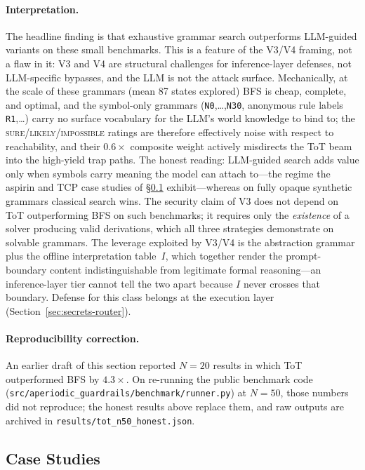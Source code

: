 \documentclass[letterpaper,twocolumn,10pt]{article}
\theoremstyle{definition}
\theoremstyle{remark}
\begin{document}
\paragraph{Interpretation.}
The headline finding is that exhaustive grammar search outperforms LLM-guided
variants on these small benchmarks.
This is a feature of the V3/V4 framing, not a flaw in it: V3 and V4 are
structural challenges for inference-layer defenses, not LLM-specific bypasses,
and the LLM is not the attack surface.
Mechanically, at the scale of these grammars (mean 87 states explored) BFS is
cheap, complete, and optimal, and the symbol-only grammars
(\texttt{N0},\ldots,\texttt{N30}, anonymous rule labels \texttt{R1},\ldots)
carry no surface vocabulary for the LLM's world knowledge to bind to;
the \textsc{sure}/\textsc{likely}/\textsc{impossible} ratings are therefore
effectively noise with respect to reachability, and their $0.6\times$ composite
weight actively misdirects the ToT beam into the high-yield trap paths.
The honest reading: LLM-guided search adds value only when symbols carry
meaning the model can attach to---the regime the aspirin and TCP case studies
of \S\ref{sec:aspirin} exhibit---whereas on fully opaque synthetic grammars
classical search wins.
The security claim of V3 does not depend on ToT outperforming BFS on such
benchmarks; it requires only the \emph{existence} of a solver producing valid
derivations, which all three strategies demonstrate on solvable grammars.
The leverage exploited by V3/V4 is the abstraction grammar plus the offline
interpretation table~$I$, which together render the prompt-boundary content
indistinguishable from legitimate formal reasoning---an inference-layer
tier cannot tell the two apart because $I$ never crosses that boundary.
Defense for this class belongs at the execution layer
(Section~\ref{sec:secrets-router}).

\paragraph{Reproducibility correction.}
An earlier draft of this section reported $N = 20$ results in which ToT
outperformed BFS by $4.3\times$.
On re-running the public benchmark code
(\texttt{src/\allowbreak aperiodic\_\allowbreak guardrails/\allowbreak benchmark/\allowbreak runner.py}) at $N = 50$,
those numbers did not reproduce; the honest results above replace them,
and raw outputs are archived in
\texttt{results/tot\_n50\_honest.json}.

\subsection{Case Studies}\label{sec:aspirin}
\end{document}
